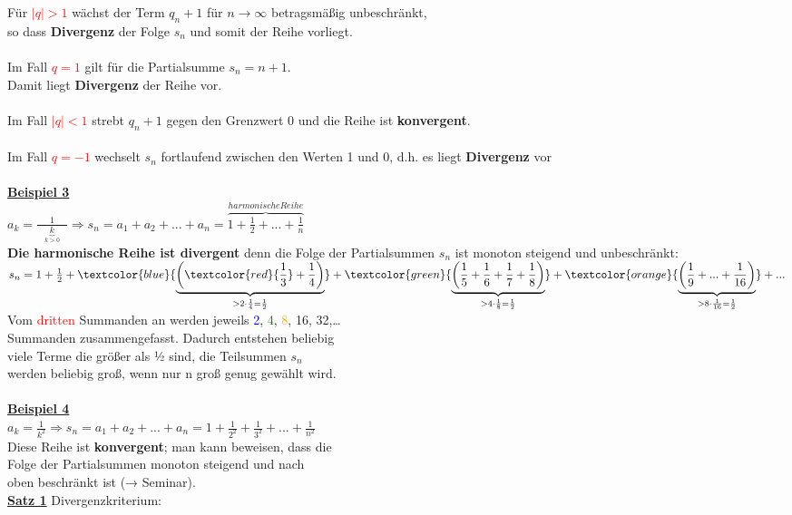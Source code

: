 \documentclass[12pt,a4paper]{article}
\begin{document}
Für \textcolor{red}{$|q|>1$} wächst der Term $q_n+1$ für $n\rightarrow\infty$ betragsmäßig unbeschränkt,\\ so dass \textbf{Divergenz} der Folge $s_n$ und somit der Reihe vorliegt.
\\
\\
Im Fall \textcolor{red}{$q=1$} gilt für die Partialsumme $s_n=n+1$.\\Damit liegt \textbf{Divergenz} der Reihe vor.
\\
\\
Im Fall \textcolor{red}{$|q|<1$} strebt $q_n+1$ gegen den Grenzwert 0 und die Reihe ist \textbf{konvergent}.
\\
\\
Im Fall \textcolor{red}{$q=-1$} wechselt $s_n$ fortlaufend zwischen den Werten 1 und 0, d.h. es liegt \textbf{Divergenz} vor
\\
\\
\underline{\textbf{Beispiel 3}}\\
$a_k=\frac{1}{\phantom{...}\underbrace{k}_{k>0}\phantom{...}}\Rightarrow s_n=a_1+a_2+...+a_n=\overbrace{1+\frac{1}{2}+...+\frac{1}{n}}^{harmonische Reihe}$\\
\textbf{Die harmonische Reihe ist divergent} denn die Folge der Partialsummen $s_n$ ist monoton steigend und unbeschränkt:\\
$s_n=1+\frac{1}{2}+\textcolor{blue}{\underbrace{\biggl(\textcolor{red}{\frac{1}{3}}+\frac{1}{4}\biggr)}_{>2\cdot\frac{1}{4}=\frac{1}{2}}}+\textcolor{green}{\underbrace{\biggl(\frac{1}{5}+\frac{1}{6}+\frac{1}{7}+\frac{1}{8}\biggr)}_{>4\cdot\frac{1}{8}=\frac{1}{2}}}+\textcolor{orange}{\underbrace{\biggl(\frac{1}{9}+...+\frac{1}{16}\biggr)}_{>8\cdot\frac{1}{16}=\frac{1}{2}}}+...$
\\
Vom \textcolor{red}{dritten} Summanden an werden jeweils \textcolor{blue}{2}, \textcolor{green}{4}, \textcolor{orange}{8}, 16, 32,…\\
Summanden zusammengefasst. Dadurch entstehen beliebig\\
viele Terme die größer als ½ sind, die Teilsummen $s_n$\\
werden beliebig groß, wenn nur n groß genug gewählt wird. \\
\\
\underline{\textbf{Beispiel 4}}\\
$a_k=\frac{1}{k^2}\Rightarrow s_n=a_1+a_2+...+a_n=1+\frac{1}{2^2}+\frac{1}{3^2}+...+\frac{1}{n^2}$
\\
Diese Reihe ist \textbf{konvergent}; man kann beweisen, dass die\\
Folge der Partialsummen monoton steigend und nach\\
oben beschränkt ist (→ Seminar). \\
\newpage
\underline{\textbf{Satz 1}} Divergenzkriterium:\\
\end{document}

